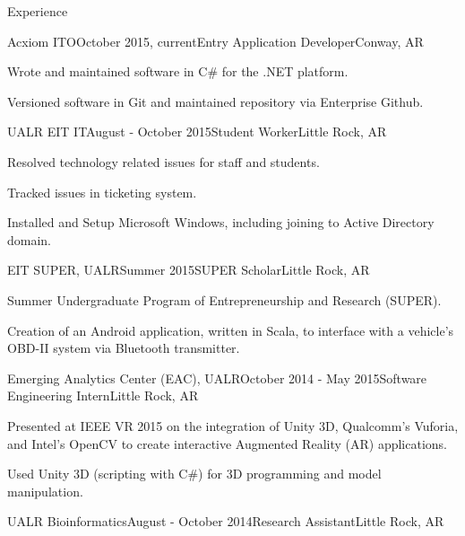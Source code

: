 \documentclass{resume} %
\begin{document}
\begin{rSection}{Experience}

\begin{rSubsection}{Acxiom ITO}{October 2015, current}{Entry Application Developer}{Conway, AR}

	\item Wrote and maintained software in C\# for the .NET platform.
	\item Versioned software in Git and maintained repository via Enterprise Github.
\end{rSubsection}

\begin{rSubsection}{UALR EIT IT}{August - October 2015}{Student Worker}{Little Rock, AR}

	\item Resolved technology related issues for staff and students.
	\item Tracked issues in ticketing system.
	\item Installed and Setup Microsoft Windows, including joining to Active Directory domain.
\end{rSubsection}

\begin{rSubsection}{EIT SUPER, UALR}{Summer 2015}{SUPER Scholar}{Little Rock, AR}
	\item Summer Undergraduate Program of Entrepreneurship and Research (SUPER).
	\item Creation of an Android application, written in Scala, to interface with a vehicle's OBD-II system via Bluetooth transmitter.
\end{rSubsection}

\begin{rSubsection}{Emerging Analytics Center (EAC), UALR}{October 2014 - May 2015}{Software Engineering Intern}{Little Rock, AR}
	\item Presented at IEEE VR 2015 on the integration of Unity 3D, Qualcomm's Vuforia, and Intel's OpenCV to create interactive Augmented Reality (AR) applications.
	\item Used Unity 3D (scripting with C\#) for 3D programming and model manipulation.
\end{rSubsection}

\begin{rSubsection}{UALR Bioinformatics}{August - October 2014}{Research Assistant}{Little Rock, AR}


\end{rSubsection}
\end{rSection}
\end{document}
